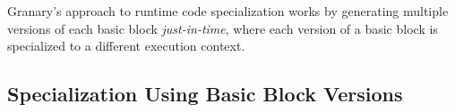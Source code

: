 \documentclass[preprint]{sigplanconf}
\begin{document}
Granary's approach to runtime code specialization works by generating multiple versions of each basic block \emph{just-in-time}, where each version of a basic block is specialized to a different execution context.


\subsection{Specialization Using Basic Block Versions}\label{sec:policies}

\end{document}
